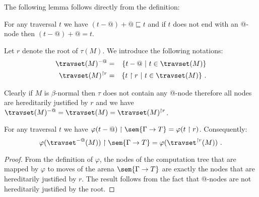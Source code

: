 The following lemma follows directly from the definition:
\begin{lemma}
\label{lem:minus_at_plus_at}
For any traversal $t$ we have $(t-@)+@ \sqsubseteq t$ and if $t$ does not end with an @-node then
$(t-@)+@ = t$.
\end{lemma}

Let $r$ denote the root of $\tau(M)$. We introduce the following notations:
\begin{eqnarray*}
\travset(M)^{-@} &=& \{ t - @ \ | \  t \in \travset(M) \} \\
\travset(M)^{\upharpoonright r} &=& \{ t  \upharpoonright r \ | \  t  \in \travset(M) \} \ .
\end{eqnarray*}

\begin{remark}
Clearly if $M$ is $\beta$-normal then $\tau$ does not contain any
@-node therefore all nodes are hereditarily justified by $r$ and we
have $\travset(M)^{-@} = \travset(M) = \travset(M)^{\upharpoonright
r }$.
\end{remark}


\begin{lemma}
\label{lem:varphi_filter}
For any traversal $t$ we have
$\varphi(t-@) \upharpoonright \sem{\Gamma \rightarrow T} = \varphi(t\upharpoonright r)$.
Consequently:
$$ \varphi(\travset^{-@}(M)) \upharpoonright \sem{\Gamma \rightarrow T} = \varphi(\travset^{\upharpoonright r}(M))\ .$$
\end{lemma}
\begin{proof}
    From the definition of $\varphi$, the nodes of the computation tree that are mapped by $\varphi$
    to moves of the arena $\sem{\Gamma \rightarrow T}$ are exactly the nodes that are hereditarily justified by $r$.
    The result follows from the fact that @-nodes are not hereditarily justified by the root.
\end{proof}

